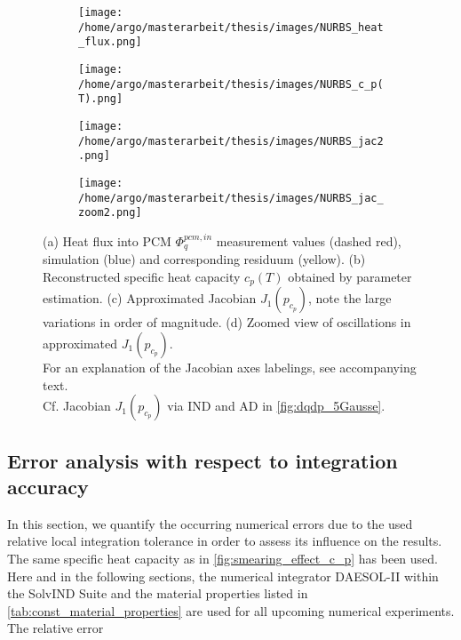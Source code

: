 \documentclass{scrartcl}[12pt, halfparskip]
\numberwithin{equation}{section}
\numberwithin{figure}{section}
\numberwithin{table}{section}
\begin{document}
\begin{figure}[H]
	\begin{subfigure}{0.49\textwidth}
		\texttt{[image: /home/argo/masterarbeit/thesis/images/NURBS\_heat\_flux.png]}
		\caption{}
	\end{subfigure}
	\begin{subfigure}{0.49\textwidth}
		\texttt{[image: /home/argo/masterarbeit/thesis/images/NURBS\_c\_p(T).png]}
		\caption{}
	\end{subfigure}
	\begin{subfigure}{0.49\textwidth}
		\hspace{0.1cm}
		\texttt{[image: /home/argo/masterarbeit/thesis/images/NURBS\_jac2.png]}
		\caption{}
	\end{subfigure}
	\begin{subfigure}{0.49\textwidth}
		\hspace{0.4cm}
		\texttt{[image: /home/argo/masterarbeit/thesis/images/NURBS\_jac\_zoom2.png]}
		\caption{}
	\end{subfigure}
	\caption{(a) Heat flux into PCM $\varPhi_q^{pcm,in}$ measurement values (dashed red), simulation (blue) and corresponding residuum (yellow). (b) Reconstructed specific heat capacity $c_p(T)$ obtained by parameter estimation. (c) Approximated Jacobian $J_1(p_{c_p})$, note the large variations in order of magnitude. (d) Zoomed view of oscillations in approximated $J_1(p_{c_p})$. \\
	For an explanation of the Jacobian axes labelings, see accompanying text. \\
	Cf. Jacobian $J_1(p_{c_p})$ via IND and AD in \cref{fig:dqdp_5Gausse}.}
	\label{fig:NURBS_results}
\end{figure}




\subsection{Error analysis with respect to integration accuracy}
In this section, we quantify the occurring numerical errors due to the used relative local integration tolerance in order to assess its influence on the results. The same specific heat capacity as in \cref{fig:smearing_effect_c_p} has been used. \\
Here and in the following sections, the numerical integrator DAESOL-II within the SolvIND Suite and the material properties listed in \cref{tab:const_material_properties} are used for all upcoming numerical experiments. \\
The relative error
\end{document}
